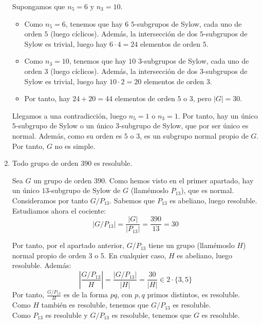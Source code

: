 \documentclass[12pt]{article}
\begin{document}
\begin{ejercicio}
\begin{enumerate}
            Supongamos que $n_{5}=6$ y $n_{3}=10$.
            \begin{itemize}
                \item Como $n_{5}=6$, tenemos que hay $6$ $5$-subgrupos de Sylow, cada uno de orden $5$ (luego cíclicos). Además, la intersección de dos $5$-subgrupos de Sylow es trivial, luego hay $6\cdot 4=24$ elementos de orden $5$.
                \item Como $n_{3}=10$, tenemos que hay $10$ $3$-subgrupos de Sylow, cada uno de orden $3$ (luego cíclicos). Además, la intersección de dos $3$-subgrupos de Sylow es trivial, luego hay $10\cdot 2=20$ elementos de orden $3$.
                \item Por tanto, hay $24+20=44$ elementos de orden $5$ o $3$, pero $|G|=30$.
            \end{itemize}

            Llegamos a una contradicción, luego $n_{5}=1$ o $n_{3}=1$. Por tanto, hay un único $5$-subgrupo de Sylow o un único $3$-subgrupo de Sylow, que por ser único es normal. Además, como su orden es $5$ o $3$, es un subgrupo normal propio de $G$. Por tanto, $G$ no es simple.
            \item Todo grupo de orden $390$ es resoluble.
            
            Sea $G$ un grupo de orden $390$. Como hemos visto en el primer apartado, hay un único $13$-subgrupo de Sylow de $G$ (llamémoslo $P_{13}$), que es normal.\\

            Consideramos por tanto $G/P_{13}$. Sabemos que $P_{13}$ es abeliano, luego resoluble. Estudiamos ahora el cociente:
            \begin{equation*}
                |G/P_{13}| = \frac{|G|}{|P_{13}|} = \frac{390}{13} = 30
            \end{equation*}

            Por tanto, por el apartado anterior, $G/P_{13}$ tiene un grupo (llamémoslo $H$) normal propio de orden $3$ o $5$. En cualquier caso, $H$ es abeliano, luego resoluble. Además:
            \begin{equation*}
                \left|\dfrac{G/P_{13}}{H}\right| = \frac{|G/P_{13}|}{|H|} =\frac{30}{|H|} \in 2\cdot \{3,5\}
            \end{equation*}
            Por tanto, $\frac{G/P_{13}}{H}$ es de la forma $pq$, con $p,q$ primos distintos, es resoluble. Como $H$ también es resoluble, tenemos que $G/P_{13}$ es resoluble.\\

            Como $P_{13}$ es resoluble y $G/P_{13}$ es resoluble, tenemos que $G$ es resoluble.
        \end{enumerate}
    \end{ejercicio}
\end{document}
